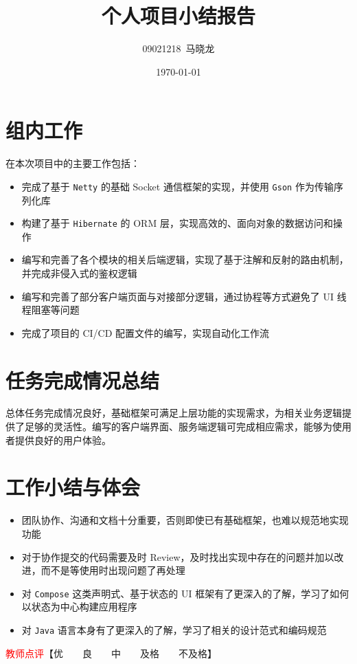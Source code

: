 \documentclass{article}
\title{个人项目小结报告}
\author{09021218~马晓龙}
\date{\today}
\begin{document}
\maketitle

\section{组内工作}

在本次项目中的主要工作包括：

\begin{itemize}
    \item 完成了基于 \texttt{Netty} 的基础 Socket 通信框架的实现，并使用 \texttt{Gson} 作为传输序列化库
    \item 构建了基于 \texttt{Hibernate} 的 ORM 层，实现高效的、面向对象的数据访问和操作
    \item 编写和完善了各个模块的相关后端逻辑，实现了基于注解和反射的路由机制，并完成非侵入式的鉴权逻辑
    \item 编写和完善了部分客户端页面与对接部分逻辑，通过协程等方式避免了 UI 线程阻塞等问题
    \item 完成了项目的 CI/CD 配置文件的编写，实现自动化工作流
\end{itemize}

\section{任务完成情况总结}

总体任务完成情况良好，基础框架可满足上层功能的实现需求，为相关业务逻辑提供了足够的灵活性。编写的客户端界面、服务端逻辑可完成相应需求，能够为使用者提供良好的用户体验。

\section{工作小结与体会}

\begin{itemize}
    \item 团队协作、沟通和文档十分重要，否则即使已有基础框架，也难以规范地实现功能
    \item 对于协作提交的代码需要及时 Review，及时找出实现中存在的问题并加以改进，而不是等使用时出现问题了再处理
    \item 对 \texttt{Compose} 这类声明式、基于状态的 UI 框架有了更深入的了解，学习了如何以状态为中心构建应用程序
    \item 对 \texttt{Java} 语言本身有了更深入的了解，学习了相关的设计范式和编码规范
\end{itemize}

\vfill
\noindent\textcolor{red}{教师点评}【优~~~~良~~~~中~~~~及格~~~~不及格】
\end{document}
